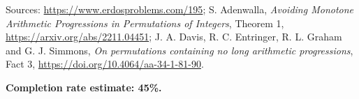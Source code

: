Sources: \url{https://www.erdosproblems.com/195}; S. Adenwalla, \emph{Avoiding Monotone Arithmetic Progressions in Permutations of Integers}, Theorem 1, \url{https://arxiv.org/abs/2211.04451}; J. A. Davis, R. C. Entringer, R. L. Graham and G. J. Simmons, \emph{On permutations containing no long arithmetic progressions}, Fact 3, \url{https://doi.org/10.4064/aa-34-1-81-90}.

\textbf{Completion rate estimate: 45\%.}

